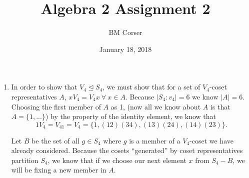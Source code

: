 \documentclass[10pt]{article}
\author{BM Corser}
\title{Algebra 2 Assignment 2}
\date{January 18, 2018}
\begin{document}
  \maketitle 
  \begin{enumerate}
    \item In order to show that $V_4 \trianglelefteq S_4$, we must show that
      for a set of $V_4$-coset representatives $A$, $xV_4 = V_4x \ \forall \ x
      \in A$. Because $|S_4 : v_4| = 6$ we know $|A| = 6$. Choosing the first
      member of $A$ as 1, (now all we know about $A$ is that $A = \{1, ... \}$) by
      the property of the identity element, we know that
      $$1V_4 = V_41 = V_4 = \{1, (12)(34), (13)(24), (14)(23) \}.$$

      Let $B$ be the set of all $g \in S_4$ where $g$ is a member of a
      $V_4$-coset we have already considered. Because the cosets ``generated''
      by coset representatives partition $S_4$, we know that if we choose our
      next element $x$ from $S_4 - B$, we will be fixing a new member in $A$.


\end{enumerate}
\end{document}

